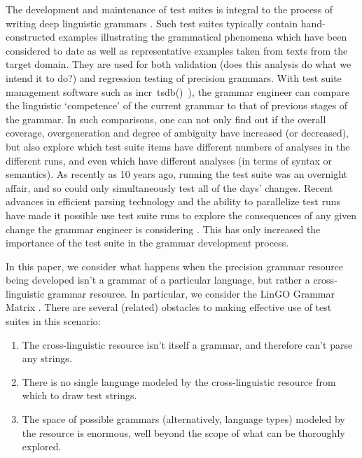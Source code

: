 \documentclass[11pt]{article}
\newcommand{\itsdb}{\mbox{\sf \lbrack incr tsdb()\rbrack}}
\begin{document}
The development and maintenance of test suites is integral to the
process of writing deep linguistic grammars \cite{Oep:Fli:98,FIX_ME}.
Such test suites typically contain hand-constructed examples
illustrating the grammatical phenomena which have been considered to
date as well as representative examples taken from texts from the
target domain.  They are used for both validation (does this analysis
do what we intend it to do?) and regression testing of precision
grammars.  With test suite management software such as \itsdb\
\cite{Oepen:01}), the grammar engineer can compare the linguistic
`competence' of the current grammar to that of previous stages of the
grammar.  In such comparisons, one can not only find out if the
overall coverage, overgeneration and degree of ambiguity have
increased (or decreased), but also explore which test suite items have
different numbers of analyses in the different runs, and even which
have different analyses (in terms of syntax or semantics).  As
recently as 10 years ago, running the test suite was an overnight
affair, and so could only simultaneously test all of the days'
changes.  Recent advances in efficient parsing technology
\cite{Oep:Fli:Tsu:02} and the ability to parallelize test runs have made
it possible use test suite runs to explore the consequences of any
given change the grammar engineer is considering
\cite{Oep:Ben:Cal:Fli:Sie:02}.  This has only increased the importance of
the test suite in the grammar development process.

In this paper, we consider what happens when the precision grammar
resource being developed isn't a grammar of a particular language, but
rather a cross-linguistic grammar resource.  In particular, we
consider the LinGO Grammar Matrix
\cite{Ben:Fli:Oep:02,Ben:Fli:05,Dre:Ben:05}.  There are several
(related) obstacles to making effective use of test suites in this
scenario:

\begin{enumerate}
\item The cross-linguistic resource isn't itself a grammar, and therefore
can't parse any strings.
\item There is no single language modeled by the cross-linguistic resource
from which to draw test strings.
\item The space of possible grammars (alternatively, language types) modeled
by the resource is enormous, well beyond the scope of what can be 
thoroughly explored.
\end{enumerate}
\end{document}
